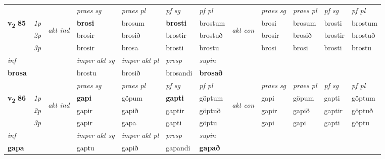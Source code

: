 \begin{longtable}[l]{X>{\footnotesize\itshape}llXXXXlXXXX}
 & &   & \textit{praes sg}  & \textit{praes pl}    & \textit{ pf sg} & \textit{pf pl} & & \textit{praes sg}  & \textit{praes pl}    & \textit{pf sg} & \textit{pf pl }  \\ \cmidrule{4-7} \cmidrule{9-12}
 \multirow{2}{*}{{{\textbf{v{\textsubscript{2}}} \Large{\textbf{85}}}}}  & 1p & \multirow{3}{*}{\begin{turn}{90}\textit{akt ind}\end{turn}} & \textbf{brosi} & brosum & \textbf{brosti} & brostum & \multirow{3}{*}{\begin{turn}{90}\textit{akt con}\end{turn}} &brosi & brosum & brosti & brostum\\*
 & 2p &  &  brosir  & brosið & brostir & brostuð & & brosir & brosið & brostir & brostuð \\*
 & 3p &  & brosir & brosa & brosti & brostu & & brosi & brosi& brosti & brostu \\*
\cmidrule{4-7} \cmidrule{9-12}

   {\textit{inf}} & &  & \textit{imper akt sg} & \textit{imper akt pl}   & \textit{presp} & \textit{supin}   \\*
  {\textbf{brosa}} & && brostu  & brosið   & brosandi &  \textbf{brosað}   \\*

\midrule

 & &   & \textit{praes sg}  & \textit{praes pl}    & \textit{ pf sg} & \textit{pf pl} & & \textit{praes sg}  & \textit{praes pl}    & \textit{pf sg} & \textit{pf pl }  \\ \cmidrule{4-7} \cmidrule{9-12}
 \multirow{2}{*}{{{\textbf{v{\textsubscript{2}}} \Large{\textbf{86}}}}}  & 1p & \multirow{3}{*}{\begin{turn}{90}\textit{akt ind}\end{turn}} & \textbf{gapi} & göpum & \textbf{gapti} & göptum & \multirow{3}{*}{\begin{turn}{90}\textit{akt con}\end{turn}} &gapi & göpum & gapti & göptum\\*
 & 2p &  &  gapir  & gapið & gaptir & göptuð & & gapir & gapið & gaptir & göptuð \\*
 & 3p &  & gapir & gapa & gapti & göptu & & gapi & gapi& gapti & göptu \\*
\cmidrule{4-7} \cmidrule{9-12}

   {\textit{inf}} & &  & \textit{imper akt sg} & \textit{imper akt pl}   & \textit{presp} & \textit{supin}   \\*
  {\textbf{gapa}} & && gaptu  & gapið   & gapandi &  \textbf{gapað}   \\*


\end{longtable}
